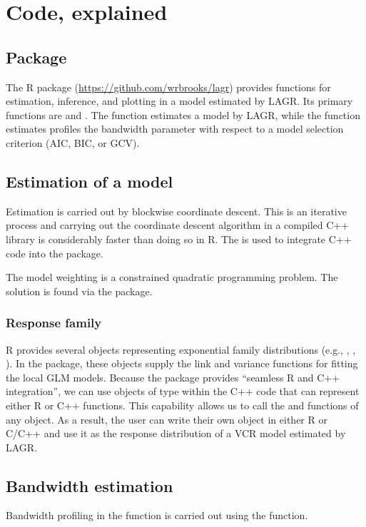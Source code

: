 \section{Code, explained}

\subsection{Package}
The R package  (\url{https://github.com/wrbrooks/lagr})  provides functions for estimation, inference, and plotting in a model estimated by LAGR. Its primary functions are  and . The  function estimates a model by LAGR, while the  function estimates profiles the bandwidth parameter with respect to a model selection criterion (AIC, BIC, or GCV).

\subsection{Estimation of a model}
Estimation is carried out by blockwise coordinate descent. This is an iterative process and carrying out the coordinate descent algorithm in a compiled C++ library is considerably faster than doing so in R. The  is used to integrate C++ code into the  package.

The model weighting is a constrained quadratic programming problem. The solution is found via the  package.

\subsubsection{Response family}
R provides several  objects representing exponential family distributions (e.g., , , ). In the  package, these objects supply the link and variance functions for fitting the local GLM models. Because the  package provides “seamless R and C++ integration”, we can use objects of type  within the C++ code that can represent either R or C++ functions. This capability allows us to call the  and  functions of any  object. As a result, the user can write their own  object in either R or C/C++ and use it as the response distribution of a VCR model estimated by LAGR.

\subsection{Bandwidth estimation}
Bandwidth profiling in the  function is carried out using the  function. 

